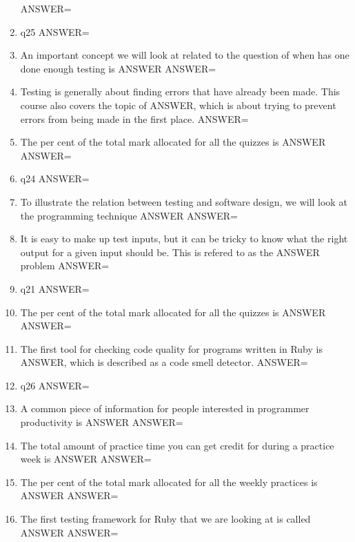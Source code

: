 \documentclass{exam}
\begin{document}
\begin{enumerate}
ANSWER=
\item q25\newline
ANSWER=
\item An important concept we will look at related to the question of when has one done enough testing is ANSWER\newline
ANSWER=
\item Testing is generally about finding errors that have already been made.  This course also covers the topic of ANSWER, which is about trying to prevent errors from being made in the first place.\newline
ANSWER=
\item The per cent of the total mark allocated for all the quizzes is ANSWER\newline
ANSWER=
\item q24\newline
ANSWER=
\item To illustrate the relation between testing and software design, we will look at the programming technique ANSWER\newline
ANSWER=
\item It is easy to make up test inputs, but it can be tricky to know what the right output for a given input should be.  This is refered to as the ANSWER problem\newline
ANSWER=
\item q21\newline
ANSWER=
\item The per cent of the total mark allocated for all the quizzes is ANSWER\newline
ANSWER=
\item The first tool for checking code quality for programs written in Ruby is ANSWER, which is described as a code smell detector.\newline
ANSWER=
\item q26\newline
ANSWER=
\item A common piece of information for people interested in programmer productivity is ANSWER\newline
ANSWER=
\item The total amount of practice time you can get credit for during a practice week is ANSWER\newline
ANSWER=
\item The per cent of the total mark allocated for all the weekly practices is ANSWER\newline
ANSWER=
\item The first testing framework for Ruby that we are looking at is called ANSWER\newline
ANSWER=
\end{enumerate}
\end{document}
